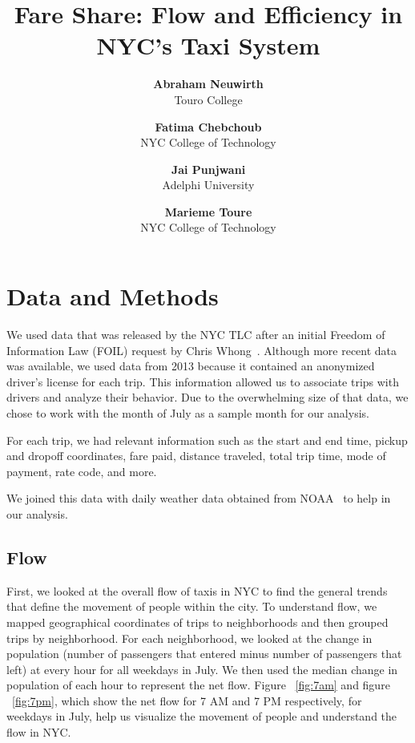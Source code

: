 \documentclass[twocolumn]{article}
\title{Fare Share: Flow and Efficiency in NYC's Taxi System}
\author{%
\normalsize{\textbf{Abraham Neuwirth}}\\ %
\small Touro College \\ %
\and %
\normalsize{\textbf{Fatima Chebchoub}}\\ %
\small NYC College of Technology\\ %
\and %
\normalsize{\textbf{Jai Punjwani}}\\%
\small Adelphi University\\ %
\and %
\normalsize{\textbf{Marieme Toure}}\\ %
\small NYC College of Technology\\ %
}
\date{\vspace{-5ex}}
\begin{document}

\section{Data and Methods}
We used data that was released by the NYC TLC after an initial Freedom of Information Law (FOIL) request by Chris Whong~\cite{Whong:2014}. Although more recent data was available, we used data from 2013 because it contained an anonymized driver’s license for each trip. This information allowed us to associate trips with drivers and analyze their behavior. Due to the overwhelming size of that data, we chose to work with the month of July as a sample month for our analysis.

For each trip, we had relevant information such as the start and end time, pickup and dropoff coordinates, fare paid, distance traveled, total trip time, mode of payment, rate code, and more.

We joined this data with daily weather data obtained from NOAA~\cite{NOAA:2016} to help in our analysis. 
\subsection{Flow}
First, we looked at the overall flow of taxis in NYC to find the general trends that define the movement of people within the city. To understand flow, we mapped geographical coordinates of trips to neighborhoods and then grouped trips by neighborhood. For each neighborhood, we looked at the change in population (number of passengers that entered minus number of passengers that left) at every hour for all weekdays in July. We then used the median change in population of each hour to represent the net flow. Figure ~\ref{fig:7am} and figure ~\ref{fig:7pm}, which show the net flow for 7 AM and 7 PM respectively, for weekdays in July, help us visualize the movement of people and understand the flow in NYC.
\end{document}
